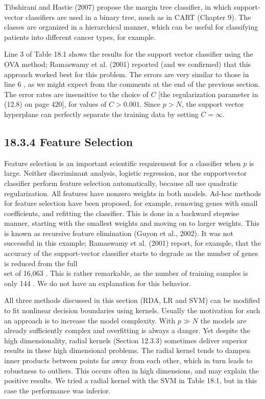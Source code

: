 \documentclass[10pt]{article}
\begin{document}
Tibshirani and Hastie (2007) propose the margin tree classifier, in which support-vector classifiers are used in a binary tree, much as in CART (Chapter 9). The classes are organized in a hierarchical manner, which can be useful for classifying patients into different cancer types, for example.

Line 3 of Table 18.1 shows the results for the support vector classifier using the OVA method; Ramaswamy et al. (2001) reported (and we confirmed) that this approach worked best for this problem. The errors are very similar to those in line 6 , as we might expect from the comments at the end of the previous section. The error rates are insensitive to the choice of $C$ [the regularization parameter in (12.8) on page 420], for values of $C>0.001$. Since $p>N$, the support vector hyperplane can perfectly separate the training data by setting $C=\infty$.

\subsection*{18.3.4 Feature Selection}
Feature selection is an important scientific requirement for a classifier when $p$ is large. Neither discriminant analysis, logistic regression, nor the supportvector classifier perform feature selection automatically, because all use quadratic regularization. All features have nonzero weights in both models. Ad-hoc methods for feature selection have been proposed, for example, removing genes with small coefficients, and refitting the classifier. This is done in a backward stepwise manner, starting with the smallest weights and moving on to larger weights. This is known as recursive feature elimination (Guyon et al., 2002). It was not successful in this example; Ramaswamy et al. (2001) report, for example, that the accuracy of the support-vector classifier starts to degrade as the number of genes is reduced from the full\\
set of 16,063 . This is rather remarkable, as the number of training samples is only 144 . We do not have an explanation for this behavior.

All three methods discussed in this section (RDA, LR and SVM) can be modified to fit nonlinear decision boundaries using kernels. Usually the motivation for such an approach is to increase the model complexity. With $p \gg N$ the models are already sufficiently complex and overfitting is always a danger. Yet despite the high dimensionality, radial kernels (Section 12.3.3) sometimes deliver superior results in these high dimensional problems. The radial kernel tends to dampen inner products between points far away from each other, which in turn leads to robustness to outliers. This occurs often in high dimensions, and may explain the positive results. We tried a radial kernel with the SVM in Table 18.1, but in this case the performance was inferior.
\end{document}
